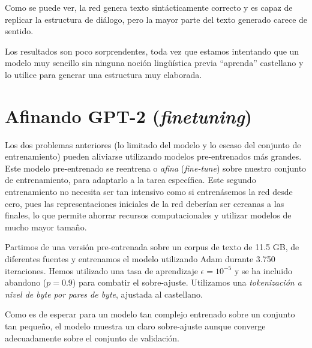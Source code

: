 Como se puede ver, la red genera texto sintácticamente correcto y es capaz de replicar la estructura de diálogo, pero la mayor parte del texto generado carece de sentido. 

Los resultados son poco sorprendentes, toda vez que estamos intentando que un modelo  muy sencillo sin ninguna noción lingüística previa ``aprenda'' castellano y lo utilice para generar una estructura muy elaborada. 

\section{Afinando GPT-2 (\textit{finetuning})}
Los dos problemas anteriores (lo limitado del modelo y lo escaso del conjunto de entrenamiento) pueden aliviarse utilizando modelos pre-entrenados más grandes. Este modelo pre-entrenado se reentrena o \textit{afina} (\textit{fine-tune}) sobre nuestro conjunto de entrenamiento, para adaptarlo a la tarea específica. Este segundo entrenamiento no necesita ser tan intensivo como si entrenásemos la red desde cero, pues las representaciones iniciales de la red deberían ser cercanas a las finales, lo que permite ahorrar recursos computacionales y utilizar modelos de mucho mayor tamaño.

Partimos de una versión pre-entrenada sobre un corpus de texto de 11.5 GB, de diferentes fuentes \cite{gpt2trained} y entrenamos el modelo utilizando Adam durante 3.750 iteraciones. Hemos utilizado una tasa de aprendizaje \( \epsilon = 10^{-5} \) y se ha incluido abandono (\( p = 0.9 \)) para combatir el sobre-ajuste. Utilizamos una \textit{tokenización a nivel de byte por pares de byte}, ajustada al castellano.

Como es de esperar para un modelo tan complejo entrenado sobre un conjunto tan pequeño, el modelo muestra un claro sobre-ajuste aunque converge adecuadamente sobre el conjunto de validación.

